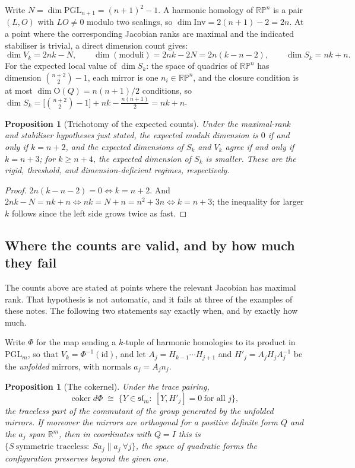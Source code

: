 \documentclass[11pt,a4paper]{article}
\theoremstyle{plain}
\newtheorem{proposition}[theorem]{Proposition}
\theoremstyle{definition}
\theoremstyle{remark}
\newcommand{\PGL}{\mathrm{PGL}}
\begin{document}
Write $N=\dim\PGL_{n+1}=(n+1)^2-1$. A harmonic homology of $\mathbb{RP}^n$ is a pair
$(L,O)$ with $LO\neq0$ modulo two scalings, so $\dim\mathrm{Inv}=2(n+1)-2=2n$.
At a point where the corresponding Jacobian ranks are maximal and the indicated
stabiliser is trivial, a direct dimension count gives:
\[
  \dim V_k=2nk-N,\qquad
  \dim(\text{moduli})=2nk-2N=2n(k-n-2),\qquad
  \dim S_k=nk+n .
\]
For the expected local value of $\dim S_k$: the space of quadrics of $\mathbb{RP}^n$ has dimension
$\binom{n+2}2-1$, each mirror is one $n_i\in\mathbb{RP}^n$, and the closure
condition is at most $\dim\mathrm{O}(Q)=n(n+1)/2$ conditions, so
$\dim S_k=\bigl[\binom{n+2}2-1\bigr]+nk-\frac{n(n+1)}2=nk+n$.

\begin{proposition}[Trichotomy of the expected counts]\label{prop:trichotomy}
Under the maximal-rank and stabiliser hypotheses just stated, the expected moduli
dimension is $0$ if and only if $k=n+2$, and the expected dimensions of $S_k$ and
$V_k$ agree if and only if $k=n+3$; for $k\ge n+4$, the expected dimension of
$S_k$ is smaller. These are the rigid, threshold, and dimension-deficient regimes,
respectively.
\end{proposition}

\begin{proof}
$2n(k-n-2)=0\iff k=n+2$. And $2nk-N=nk+n\iff nk=N+n=n^2+3n\iff k=n+3$; the
inequality for larger $k$ follows since the left side grows twice as fast.
\end{proof}

\subsection{Where the counts are valid, and by how much they fail}

The counts above are stated at points where the relevant Jacobian has maximal rank.
That hypothesis is not automatic, and it fails at three of the examples of these
notes. The following two statements say exactly when, and by exactly how much.

Write $\Phi$ for the map sending a $k$-tuple of harmonic homologies to its product in
$\PGL_m$, so that $V_k=\Phi^{-1}(\mathrm{id})$, and let $A_j=H_{k-1}\cdots H_{j+1}$
and $H'_j=A_jH_jA_j^{-1}$ be the \emph{unfolded} mirrors, with normals $a_j=A_jn_j$.

\begin{proposition}[The cokernel]\label{prop:cokernel}
Under the trace pairing,
\[
  \operatorname{coker}d\Phi\;\cong\;\{Y\in\mathfrak{sl}_m:\ [Y,H'_j]=0\ \text{for all }j\},
\]
the traceless part of the commutant of the group generated by the unfolded mirrors.
If moreover the mirrors are orthogonal for a positive definite form $Q$
and the $a_j$ span $\mathbb{R}^m$, then in coordinates with $Q=I$ this is
$\{S\ \text{symmetric traceless}:\ Sa_j\parallel a_j\ \forall j\}$, the space of
quadratic forms the configuration preserves beyond the given one.
\end{proposition}
\end{document}
